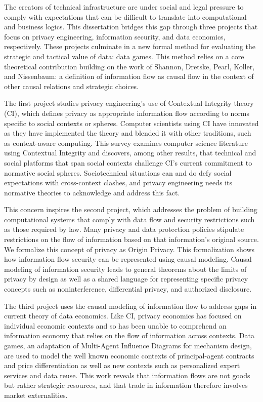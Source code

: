 \documentclass[../thesis.tex]{subfiles}
\begin{document}
 The creators of technical infrastructure are under social and
 legal pressure to comply with expectations that can be difficult
 to translate into computational and business logics.
 This dissertation bridges this gap through three projects that focus on
 privacy engineering, information security, and data economics, respectively.
 These projects culminate in a new formal method for evaluating the strategic
 and tactical value of data: data games.
 This method relies on a core theoretical contribution building on the work of
 Shannon, Dretske, Pearl, Koller, and Nissenbaum: a definition of information
 flow as causal flow in the context
 of other causal relations and strategic choices.

 The first project studies privacy engineering's use of
 Contextual Integrity theory (CI), which defines
 privacy as appropriate information flow according to norms
 specific to social contexts or spheres.
 Computer scientists using CI
 have innovated as they have implemented the theory and
 blended it with other traditions, such as context-aware
 computing. This survey examines
 computer science literature using Contextual Integrity and
 discovers, among other results, that technical and social platforms
 that span social contexts challenge CI's current commitment
 to normative social spheres.
 Sociotechnical situations can and do defy social expectations
 with cross-context clashes, and privacy engineering
 needs its normative theories to acknowledge and address this
 fact.
 
 This concern inspires the second project, which addresses the
 problem of building computational systems that comply with data
 flow and security restrictions such as those required by law.
 Many privacy and data protection policies stipulate
 restrictions on the flow of information based on that
 information's original source.
 We formalize this concept of privacy as Origin Privacy.
 This formalization shows how information flow security
 can be represented using causal modeling.
 Causal modeling of information security leads to
 general theorems about the limits of privacy by design
 as well as a shared language for representing specific
 privacy concepts such as noninterference, differential
 privacy, and authorized disclosure.

 The third project uses the causal modeling of information
 flow to address gaps in current theory of data economics.
 Like CI, privacy economics has focused on individual
 economic contexts and so has been unable to comprehend
 an information economy that relies on the flow of
 information across contexts.
 Data games, an adaptation of Multi-Agent Influence Diagrams
 for mechanism design, are used to model the well known
 economic contexts of principal-agent contracts and
 price differentiation as well as new contexts
 such as personalized expert services and data reuse.
 This work reveals that information flows are not
 goods but rather strategic resources, and that
 trade in information therefore involves
 market externalities.
 
 
\end{document}
